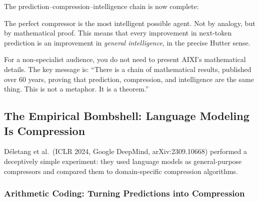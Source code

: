 \documentclass[11pt, a4paper]{article}
\begin{document}
\begin{keyinsight}
The prediction--compression--intelligence chain is now complete:

\begin{center}
\end{center}

The perfect compressor is the most intelligent possible agent. Not by
analogy, but by mathematical proof. This means that every improvement in
next-token prediction is an improvement in \emph{general intelligence},
in the precise Hutter sense.
\end{keyinsight}

\begin{speakingnote}
For a non-specialist audience, you do not need to present AIXI's
mathematical details. The key message is: ``There is a chain of
mathematical results, published over 60 years, proving that prediction,
compression, and intelligence are the same thing. This is not a metaphor.
It is a theorem.''
\end{speakingnote}


\subsection{The Empirical Bombshell: Language Modeling Is Compression}

D\'{e}letang et al.\ (ICLR 2024, Google DeepMind, arXiv:2309.10668)
performed a deceptively simple experiment: they used language models as
general-purpose compressors and compared them to domain-specific
compression algorithms.

\subsubsection{Arithmetic Coding: Turning Predictions into Compression}
\label{sec:arithmetic}
\end{document}
